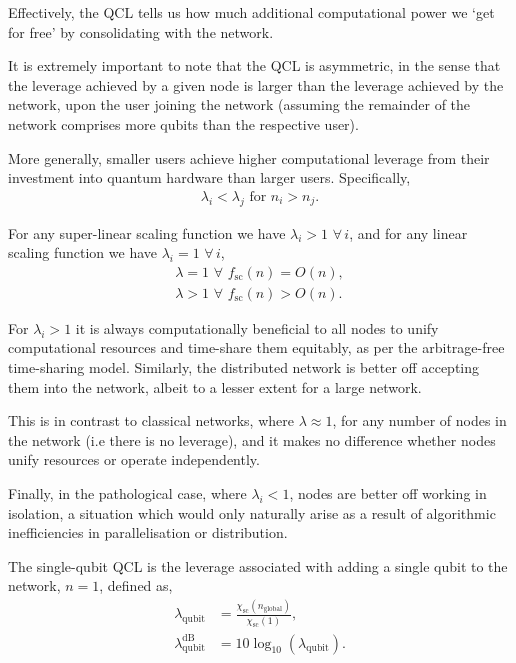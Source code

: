 Effectively, the QCL tells us how much additional computational power we `get for free' by consolidating with the network.

It is extremely important to note that the QCL is asymmetric, in the sense that the leverage achieved by a given node is larger than the leverage achieved by the network, upon the user joining the network (assuming the remainder of the network comprises more qubits than the respective user).

More generally, smaller users achieve higher computational leverage from their investment into quantum hardware than larger users. Specifically,
\begin{align}
	\lambda_i<\lambda_j \,\,\mathrm{for}\,\,n_i>n_j.
\end{align}

For any super-linear scaling function we have \mbox{$\lambda_i > 1 \,\,\forall \, i$}, and for any linear scaling function we have \mbox{$\lambda_i = 1 \,\,\forall \, i$},
\begin{align}
	\lambda=1\,\,\forall\,\,f_\mathrm{sc}(n)=O(n), \nonumber \\
	\lambda>1\,\,\forall\,\,f_\mathrm{sc}(n)>O(n).	
\end{align}

For \mbox{$\lambda_i>1$} it is always computationally beneficial to all nodes to unify computational resources and time-share them equitably, as per the arbitrage-free time-sharing model. Similarly, the distributed network is better off accepting them into the network, albeit to a lesser extent for a large network.

This is in contrast to classical networks, where \mbox{$\lambda\approx 1$}, for any number of nodes in the network (i.e there is no leverage), and it makes no difference whether nodes unify resources or operate independently.

Finally, in the pathological case, where \mbox{$\lambda_i<1$}, nodes are better off working in isolation, a situation which would only naturally arise as a result of algorithmic inefficiencies in parallelisation or distribution.

\begin{definition}
The single-qubit QCL is the leverage associated with adding a single qubit to the network, \mbox{$n=1$}, defined as,
\begin{align}
	\lambda_\mathrm{qubit} &= \frac{\chi_\mathrm{sc}(n_\mathrm{global})}{\chi_\mathrm{sc}(1)},\nonumber\\
	\lambda_\mathrm{qubit}^\mathrm{dB} &= 10\log_{10}(\lambda_\mathrm{qubit}).
\end{align}
\end{definition}

